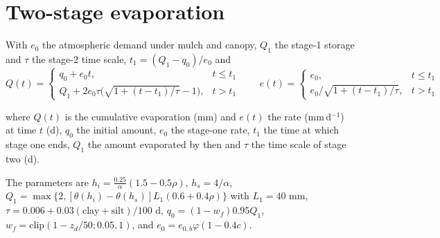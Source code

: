 \section{Two-stage evaporation}
With $e_0$ the atmospheric demand under mulch and canopy, $Q_1$ the stage-1 storage and $\tau$ the stage-2 time scale, $t_1=(Q_1-q_0)/e_0$ and
\begin{equation}Q(t)=\begin{cases}q_0+e_0t,&t\le t_1\\ Q_1+2e_0\tau\bigl(\sqrt{1+(t-t_1)/\tau}-1\bigr),&t>t_1\end{cases}\qquad e(t)=\begin{cases}e_0,&t\le t_1\\ e_0/\sqrt{1+(t-t_1)/\tau},&t>t_1\end{cases}\end{equation}
\par\noindent where $Q(t)$ is the cumulative evaporation (mm) and $e(t)$ the rate (mm\,d$^{-1}$) at time $t$ (d), $q_0$ the initial amount, $e_0$ the stage-one rate, $t_1$ the time at which stage one ends, $Q_1$ the amount evaporated by then and $\tau$ the time scale of stage two (d).

The parameters are
$h_i=\frac{0.25}{\alpha}(1.5-0.5\rho)$, $h_s=4/\alpha$, $Q_1=\max\{2,[\theta(h_i)-\theta(h_s)]L_1(0.6+0.4\rho)\}$ with $L_1=40$ mm, $\tau=0.006+0.03(\mathrm{clay}+\mathrm{silt})/100$ d, $q_0=(1-w_f)0.95Q_1$, $w_f=\mathrm{clip}(1-z_d/50;0.05,1)$, and $e_0=e_{0,b}\varphi(1-0.4c)$.

